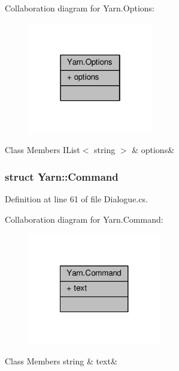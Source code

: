 Collaboration diagram for Yarn.\-Options\-:
\nopagebreak
\begin{figure}[H]
\begin{center}
\leavevmode
\includegraphics[width=154pt]{a00365}
\end{center}
\end{figure}
\begin{DoxyFields}{Class Members}
\hypertarget{a00050_ae8c616d923ceeeed192a9436c55d9917}{I\-List$<$ string $>$}\label{a00050_ae8c616d923ceeeed192a9436c55d9917}
&
options&
\\
\hline

\end{DoxyFields}
\label{a00349}
\hypertarget{a00050_a00349}{}
\subsubsection{struct Yarn\-:\-:Command}


Definition at line 61 of file Dialogue.\-cs.



Collaboration diagram for Yarn.\-Command\-:
\nopagebreak
\begin{figure}[H]
\begin{center}
\leavevmode
\includegraphics[width=164pt]{a00366}
\end{center}
\end{figure}
\begin{DoxyFields}{Class Members}
\hypertarget{a00050_a8564e5104566e145f5d917ec846444d9}{string}\label{a00050_a8564e5104566e145f5d917ec846444d9}
&
text&
\\
\hline

\end{DoxyFields}
\label{a00354}
\hypertarget{a00050_a00354}{}

